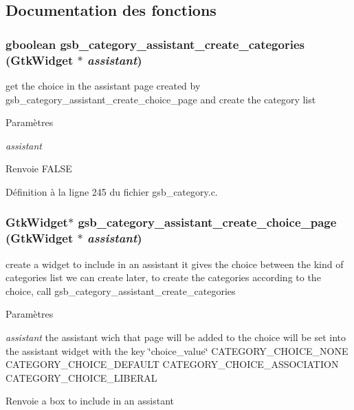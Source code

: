 \subsection{Documentation des fonctions}
\subsubsection[{gsb\_\-category\_\-assistant\_\-create\_\-categories}]{\setlength{\rightskip}{0pt plus 5cm}gboolean gsb\_\-category\_\-assistant\_\-create\_\-categories (GtkWidget $\ast$ {\em assistant})}\label{gsb__category_8c_a6f38ac76c4b1b44555742d71770eb83b}
get the choice in the assistant page created by gsb\_\-category\_\-assistant\_\-create\_\-choice\_\-page and create the category list


\begin{DoxyParams}{Paramètres}
\item[{\em assistant}]\end{DoxyParams}
\begin{DoxyReturn}{Renvoie}
FALSE 
\end{DoxyReturn}


Définition à la ligne 245 du fichier gsb\_\-category.c.

\subsubsection[{gsb\_\-category\_\-assistant\_\-create\_\-choice\_\-page}]{\setlength{\rightskip}{0pt plus 5cm}GtkWidget$\ast$ gsb\_\-category\_\-assistant\_\-create\_\-choice\_\-page (GtkWidget $\ast$ {\em assistant})}\label{gsb__category_8c_a6a84b628fc462846e25667e888c76dc7}
create a widget to include in an assistant it gives the choice between the kind of categories list we can create later, to create the categories according to the choice, call gsb\_\-category\_\-assistant\_\-create\_\-categories


\begin{DoxyParams}{Paramètres}
\item[{\em assistant}]the assistant wich that page will be added to the choice will be set into the assistant widget with the key \char`\"{}choice\_\-value\char`\"{} CATEGORY\_\-CHOICE\_\-NONE CATEGORY\_\-CHOICE\_\-DEFAULT CATEGORY\_\-CHOICE\_\-ASSOCIATION CATEGORY\_\-CHOICE\_\-LIBERAL\end{DoxyParams}
\begin{DoxyReturn}{Renvoie}
a box to include in an assistant 
\end{DoxyReturn}


